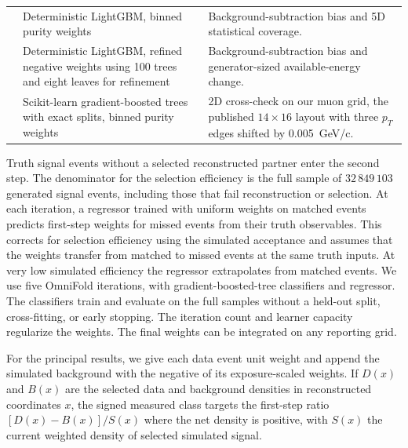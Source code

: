 \begin{table}[!t]
\begin{tabular}{@{}>{\raggedright\arraybackslash}p{}
                      >{\raggedright\arraybackslash}p{}
                      >{\raggedright\arraybackslash}p{}@{}}
    \EstDetPurity{} & Deterministic LightGBM, binned purity weights & Background-subtraction bias and 5D statistical coverage. \\
    \EstLowCap{} & Deterministic LightGBM, refined negative weights using 100 trees and eight leaves for refinement & Background-subtraction bias and generator-sized available-energy change. \\
    \EstExact{} & Scikit-learn gradient-boosted trees with exact splits, binned purity weights & 2D cross-check on our muon grid, the published $14\times16$ layout with three $p_T$ edges shifted by \SI{0.005}{GeV/c}. \\
    \bottomrule
  \end{tabular}
\end{table}

Truth signal events without a selected reconstructed partner enter the second step. The denominator for the selection efficiency is the full sample of $32\,849\,103$ generated signal events, including those that fail reconstruction or selection. At each iteration, a regressor trained with uniform weights on matched events predicts first-step weights for missed events from their truth observables. This corrects for selection efficiency using the simulated acceptance and assumes that the weights transfer from matched to missed events at the same truth inputs. At very low simulated efficiency the regressor extrapolates from matched events. We use five OmniFold iterations, with gradient-boosted-tree classifiers and regressor. The classifiers train and evaluate on the full samples without a held-out split, cross-fitting, or early stopping. The iteration count and learner capacity regularize the weights. The final weights can be integrated on any reporting grid.

For the principal results, we give each data event unit weight and append the simulated background with the negative of its exposure-scaled weights. If $D(x)$ and $B(x)$ are the selected data and background densities in reconstructed coordinates $x$, the signed measured class targets the first-step ratio $[D(x)-B(x)]/S(x)$ where the net density is positive, with $S(x)$ the current weighted density of selected simulated signal.

